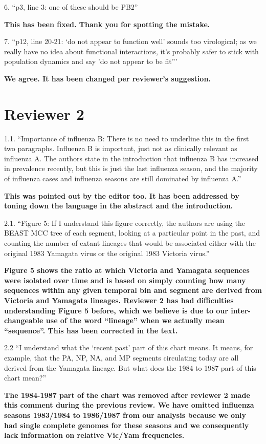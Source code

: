 \documentclass[11pt,oneside,letterpaper]{article}
\begin{document}
6. ``p3, line 3: one of these should be PB2''

\textbf{This has been fixed. Thank you for spotting the mistake.}

7. ``p12, line 20-21: `do not appear to function well' sounds too virological; as we really have no idea about functional interactions, it's probably safer to stick with population dynamics and say 'do not appear to be fit'''

\textbf{We agree. It has been changed per reviewer's suggestion.}

\section*{Reviewer 2}

1.1. ``Importance of influenza B: There is no need to underline this in the first two paragraphs.
Influenza B is important, just not as clinically relevant as influenza A.
The authors state in the introduction that influenza B has increased in prevalence recently, but this is just the last influenza season, and the majority of influenza cases and influenza seasons are still dominated by influenza A.''

\textbf{This was pointed out by the editor too.
It has been addressed by toning down the language in the abstract and the introduction.}

2.1. ``Figure 5: If I understand this figure correctly, the authors are using the BEAST MCC tree of each segment, looking at a particular point in the past, and counting the number of extant lineages that would be associated either with the original 1983 Yamagata virus or the original 1983 Victoria virus.''

\textbf{Figure 5 shows the ratio at which Victoria and Yamagata sequences were isolated over time and is based on simply counting how many sequences within any given temporal bin and segment are derived from Victoria and Yamagata lineages.
Reviewer 2 has had difficulties understanding Figure 5 before, which we believe is due to our inter-changeable use of the word ``lineage'' when we actually mean ``sequence''.
This has been corrected in the text.}

2.2 ``I understand what the `recent past' part of this chart means.
It means, for example, that the PA, NP, NA, and MP segments circulating today are all derived from the Yamagata lineage.
But what does the 1984 to 1987 part of this chart mean?''

\textbf{The 1984-1987 part of the chart was removed after reviewer 2 made this comment during the previous review.
We have omitted influenza seasons 1983/1984 to 1986/1987 from our analysis because we only had single complete genomes for these seasons and we consequently lack information on relative Vic/Yam frequencies.}
\end{document}
